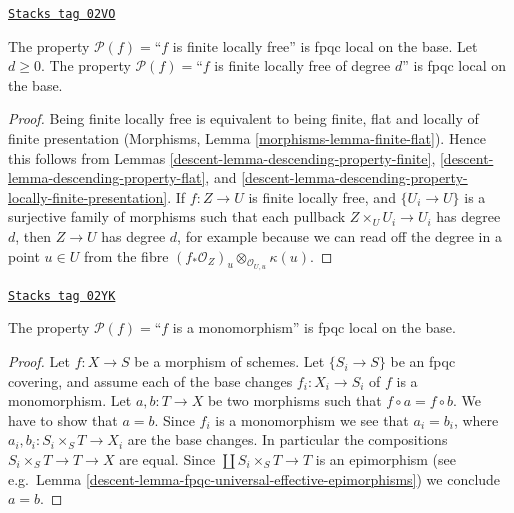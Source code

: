 \begin{lemma}
\label{descent-lemma-descending-property-finite-locally-free}
\href{https://stacks.math.columbia.edu/tag/02VO}{\texttt{Stacks tag 02VO}}

The property $\mathcal{P}(f) =$``$f$ is finite locally free''
is fpqc local on the base.
Let $d \geq 0$.
The property $\mathcal{P}(f) =$``$f$ is finite locally free of degree $d$''
is fpqc local on the base.
\end{lemma}

\begin{proof}

Being finite locally free is equivalent to being
finite, flat and locally of finite presentation
(Morphisms, Lemma \ref{morphisms-lemma-finite-flat}).
Hence this follows from Lemmas
\ref{descent-lemma-descending-property-finite},
\ref{descent-lemma-descending-property-flat}, and
\ref{descent-lemma-descending-property-locally-finite-presentation}.
If $f : Z \to U$ is finite locally free, and $\{U_i \to U\}$ is a surjective
family of morphisms such that each pullback $Z \times_U U_i \to U_i$ has
degree $d$, then $Z \to U$ has degree $d$, for example because we
can read off the degree in a point $u \in U$ from the fibre
$(f_*\mathcal{O}_Z)_u \otimes_{\mathcal{O}_{U, u}} \kappa(u)$.
\end{proof}

\begin{lemma}
\label{descent-lemma-descending-property-monomorphism}
\href{https://stacks.math.columbia.edu/tag/02YK}{\texttt{Stacks tag 02YK}}

The property $\mathcal{P}(f) =$``$f$ is a monomorphism''
is fpqc local on the base.
\end{lemma}

\begin{proof}

Let $f : X \to S$ be a morphism of schemes.
Let $\{S_i \to S\}$ be an fpqc covering, and assume
each of the base changes $f_i : X_i \to S_i$ of $f$ is
a monomorphism. Let $a, b : T \to X$ be two morphisms
such that $f \circ a = f \circ b$. We have to show that $a = b$.
Since $f_i$ is a monomorphism we see that $a_i = b_i$, where
$a_i, b_i : S_i \times_S T \to X_i$ are
the base changes. In particular the compositions
$S_i \times_S T \to T \to X$ are equal.
Since $\coprod S_i \times_S T \to T$
is an epimorphism (see
e.g.\ Lemma \ref{descent-lemma-fpqc-universal-effective-epimorphisms})
we conclude $a = b$.
\end{proof}

